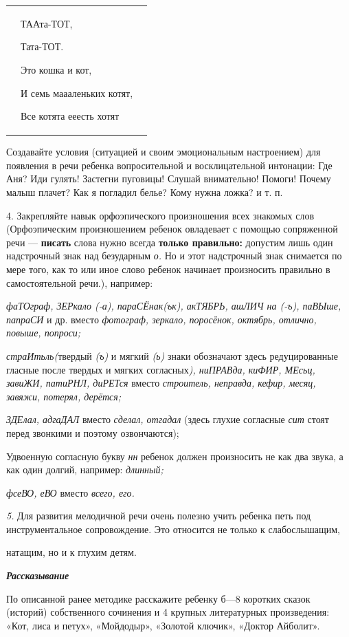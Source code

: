 \documentclass{book}
\renewcommand{\emph}[1]{\textit{#1}}
\begin{document}
\hfill\begin{tabular}{p{}p{}p{}}
&
ТААта-ТОТ,

Тата-ТОТ.

Это кошка и кот,

И семь маааленьких котят,

Все котята ееесть хотят&
\end{tabular}


Создавайте условия (ситуацией и своим эмоциональным настроением) для
появления в речи ребенка вопросительной и восклицательной интонации: Где
Аня? Иди гулять! Застегни пуговицы! Слушай внимательно! Помоги! Почему
малыш плачет? Как я погладил белье? Кому нужна ложка? и т. п.

4. Закрепляйте навык орфоэпического произношения всех знакомых слов
(Орфоэпическим произношением ребенок овладевает с помощью сопряженной
речи --- \textbf{писать} слова нужно всегда \textbf{только правильно:}
допустим лишь один надстрочный знак над безударным \emph{о.} Но и этот
надстрочный знак снимается по мере того, как то или иное слово ребенок
начинает произносить правильно в самостоятельной речи.), например:

\emph{фаТОграф, ЗЕРкало (-а), параСЁнак(ък), акТЯБРЬ, ашЛИЧ на (-ъ),
паВЫше, папраСИ} и др. вместо \emph{фотограф, зеркало, поросёнок,
октябрь, отлично, повыше, попроси;}

\emph{страИтьль(}твердый \emph{(ъ)} и мягкий \emph{(ь)} знаки обозначают
здесь редуцированные гласные после твердых и мягких согласных\emph{),
ниПРАВда, киФИР, МЕсьц, завиЖИ, патиРНЛ, диРЕТся} вместо
\emph{строитель, неправда, кефир, месяц, завяжи, потерял, дерётся;}

\emph{ЗДЕлал, адгаДАЛ} вместо \emph{сделал, отгадал} (здесь глухие
согласные \emph{сит} стоят перед звонкими и поэтому озвончаются);

Удвоенную согласную букву \emph{нн} ребенок должен произносить не как
два звука, а как один долгий, например: \emph{длинный;}

\emph{фсеВО, еВО} вместо \emph{всего, его.}

\emph{5.} Для развития мелодичной речи очень полезно учить ребенка петь
под инструментальное сопровождение. Это относится не только к
слабослышащим,

натащим, но и к глухим детям.

\emph{\textbf{Рассказывание}}

По описанной ранее методике расскажите ребенку б---8 коротких сказок
(историй) собственного сочинения и 4 крупных литературных произведения:
«Кот, лиса и петух», «Мойдодыр», «Золотой ключик», «Доктор Айболит».
\end{document}
